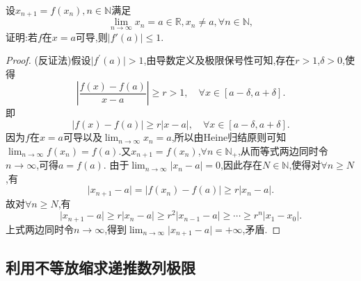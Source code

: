 \documentclass[../../main.tex]{subfiles}
\begin{document}
\begin{proposition}[反向压缩映像]\label{proposition:反向压缩映像}
设\(x_{n + 1} = f(x_n),n\in\mathbb{N}\)满足
\[
\lim_{n \to \infty} x_n = a\in\mathbb{R},x_n\neq a,\forall n\in\mathbb{N},
\]
证明:若\(f\)在\(x = a\)可导,则\(\vert f'(a)\vert\leqslant  1\).
\end{proposition}
\begin{proof}
(反证法)假设\(\vert f^\prime(a)\vert > 1\),由导数定义及极限保号性可知,存在\(r > 1\),\(\delta > 0\),使得
\[
\left\vert\frac{f(x) - f(a)}{x - a}\right\vert\geqslant r > 1, \quad\forall x\in [a - \delta, a + \delta].
\]
即
\[
\vert f(x) - f(a)\vert\geqslant r\vert x - a\vert, \quad\forall x\in [a - \delta, a + \delta].
\]
因为\(f\)在\(x = a\)可导以及\(\lim_{n\rightarrow\infty}x_n = a\),所以由Heine归结原则可知\(\lim_{n\rightarrow\infty}f(x_n) = f(a)\).又\(x_{n + 1} = f(x_n)\),\(\forall n\in\mathbb{N}_+\),从而等式两边同时令\(n\rightarrow\infty\),可得\(a = f(a)\).
由于\(\lim_{n\rightarrow\infty}\vert x_n - a\vert = 0\),因此存在\(N\in\mathbb{N}\),使得对\(\forall n\geqslant N\),有
\[
\vert x_{n + 1} - a\vert = \vert f(x_n) - f(a)\vert\geqslant r\vert x_n - a\vert.
\]
故对\(\forall n\geqslant N\),有
\[
\vert x_{n + 1} - a\vert\geqslant r\vert x_n - a\vert\geqslant r^2\vert x_{n - 1} - a\vert\geqslant\cdots\geqslant r^n\vert x_1 - x_0\vert.
\]
上式两边同时令\(n\rightarrow\infty\),得到\(\lim_{n\rightarrow\infty}\vert x_{n + 1} - a\vert = +\infty\),矛盾.
\end{proof}


\subsection{利用不等放缩求递推数列极限}
\end{document}
